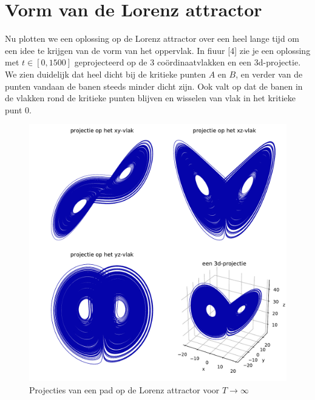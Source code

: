 \documentclass[12pt, a4paper]{article}
\theoremstyle{definition}
\begin{document}
\section{Vorm van de Lorenz attractor}
Nu plotten we een oplossing op de Lorenz attractor over een heel lange tijd om een idee te krijgen van de vorm van het oppervlak. In fiuur [4] zie je een oplossing met $t \in [0, 1500]$ geprojecteerd op de 3 coördinaatvlakken en een 3d-projectie. We zien duidelijk dat heel dicht bij de kritieke punten $A$ en $B$, en verder van de punten vandaan de banen steeds minder dicht zijn. Ook valt op dat de banen in de vlakken rond de kritieke punten blijven en wisselen van vlak in het kritieke punt $0$.

\begin{figure}
    \centering
    \includegraphics[width=0.9\linewidth]{projecties_opdracht_5.pdf}
    \caption{Projecties van een pad op de Lorenz attractor voor $T \rightarrow \infty$}
    \label{fig: projecties}
\end{figure}
\end{document}

